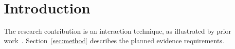 \section{Introduction}\label{sec:intro}
The research contribution is an interaction technique, as illustrated by prior work~\cite{dixon2010prefab}.
Section~\ref{sec:method} describes the planned evidence requirements.

